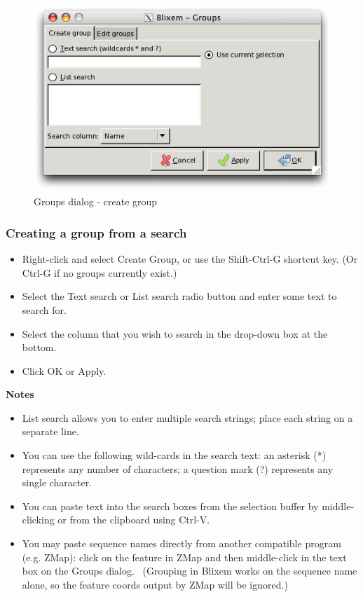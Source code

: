 \documentclass[letterpaper]{article}
\newcommand\liststyleWWviiiNumxvi{%
\renewcommand\labelitemi{{\textbullet}}
\renewcommand\labelitemii{o}
\renewcommand\labelitemiii{[F0A7?]}
\renewcommand\labelitemiv{[F0B7?]}
}
\begin{document}
\begin{figure}
\centering
\color[rgb]{0.30980393,0.5058824,0.7411765}
\includegraphics[width=11.95cm,height=7.084cm]{img_dialog_groups.png}
\caption{Groups dialog - create group}
\end{figure}

{\color[rgb]{0.30980393,0.5058824,0.7411765}\subsubsection[Creating a group from a search]{Creating a group from a search}}
\hypertarget{RefHeading33212258250716}{}\liststyleWWviiiNumxvi
\begin{itemize}
\item {
Right-click and select {\textquotesingle}Create Group{\textquotesingle},
or use the Shift-Ctrl-G shortcut key. (Or Ctrl-G if no groups currently
exist.)}
\item {
Select the {\textquotesingle}Text search{\textquotesingle} or
{\textquotesingle}List search{\textquotesingle} radio button and enter
some text to search for.}
\item {
Select the column that you wish to search in the drop-down box at the
bottom.}
\item {
Click OK or Apply.}
\end{itemize}

\bigskip

{\bfseries
Notes}

\liststyleWWviiiNumxvi
\begin{itemize}
\item {
{\textquotesingle}List search{\textquotesingle} allows you to enter
multiple search strings; place each string on a separate line.}
\item {
You can use the following wild-cards in the search text: an asterisk (*)
represents any number of characters; a question mark (?) represents any
single character.}
\item {
You can paste text into the search boxes from the selection buffer by
middle-clicking or from the clipboard using Ctrl-V.}
\item {
You may paste sequence names directly from another compatible program
(e.g. ZMap): click on the feature in ZMap and then middle-click in the
text box on the Groups dialog. \ (Grouping in Blixem works on the
sequence name alone, so the feature coords output by ZMap will be
ignored.)}
\end{itemize}
\end{document}

